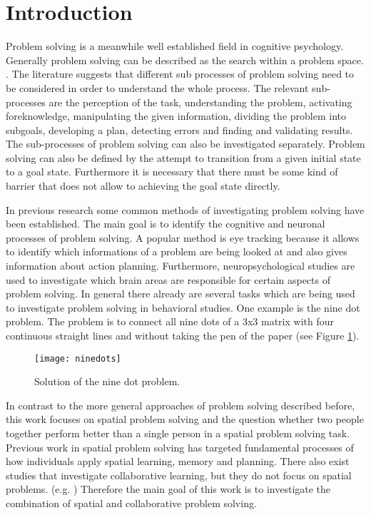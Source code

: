 \section{Introduction} \label{sec:introduction}

Problem solving is a meanwhile well established field in cognitive psychology. Generally problem solving can be described as the search within a problem space. \cite{Newell1972}. The literature suggests that different sub processes of problem solving need to be considered in order to understand the whole process. The relevant sub-processes are the perception of the task, understanding the problem, activating foreknowledge, manipulating the given information, dividing the problem into subgoals, developing a plan, detecting errors and finding and validating results. The sub-processes of problem solving can also be investigated separately. Problem solving can also be defined by the attempt to transition from a given initial state to a goal state. Furthermore it is necessary that there must be some kind of barrier that does not allow to achieving the goal state directly. \cite{muesseler2015allgemeine}

In previous research some common methods of investigating problem solving have been established. The main goal is to identify the cognitive and neuronal processes of problem solving. A popular method is eye tracking because it allows to identify which informations of a problem are being looked at and also gives information about action planning. \cite{underwood2005}  Furthermore, neuropsychological studies are used to investigate which brain areas are responsible for certain aspects of problem solving. \cite{Karnath2006} In general there already are several tasks which are being used to investigate problem solving in behavioral studies. One example is the nine dot problem. The problem is to connect all nine dots of a 3x3 matrix with four continuous straight lines and without taking the pen of the paper (see Figure \ref{fig:ninedots}).

\begin{figure}[h]
\centering
\texttt{[image: ninedots]}
\caption{Solution of the nine dot problem.}
\label{fig:ninedots}
\end{figure}

\newpage

In contrast to the more general approaches of problem solving described before, this work focuses on spatial problem solving and the question whether two people together perform better than a single person in a spatial problem solving task. 
Previous work in spatial problem solving has targeted fundamental processes of how individuals apply spatial learning, memory and planning. \cite{Waller2013} There also exist studies that investigate collaborative learning, but they do not focus on spatial problems. (e.g.  \cite{Dillenbourg1999} \cite{Hesse2015}) Therefore the main goal of this work is to investigate the combination of spatial and collaborative problem solving.  


